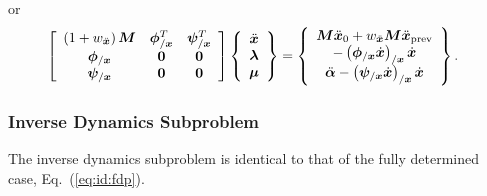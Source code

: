 or
\begin{align}
	\sqbr{\matr{ccc}{
		\plbr{1 + w_{\ddot{\T{x}}}} \TT{M} & \T{\phi}_{/\T{x}}^T & \T{\psi}_{/\T{x}}^T
		\\
		\T{\phi}_{/\T{x}} & \TT{0} & \TT{0}
		\\
		\T{\psi}_{/\T{x}} & \TT{0} & \TT{0}
	}} \cubr{\cvvect{
		\ddot{\T{x}}
		\\
		\T{\lambda}
		\\
		\T{\mu}
	}}
	&=
	\cubr{\cvvect{
		\TT{M} \ddot{\T{x}}_0 + w_{\ddot{\T{x}}} \TT{M} \ddot{\T{x}}_\text{prev}
		\\
		-\plbr{\T{\phi}_{/\T{x}} \dot{\T{x}}}_{/\T{x}} \dot{\T{x}}
		\\
		\ddot{\T{\alpha}}
		-
		\plbr{\T{\psi}_{/\T{x}} \dot{\T{x}}}_{/\T{x}} \dot{\T{x}}
	}}
	.
\end{align}

\subsubsection{Inverse Dynamics Subproblem}
The inverse dynamics subproblem is identical to that
of the fully determined case, Eq.~(\ref{eq:id:fdp}).


